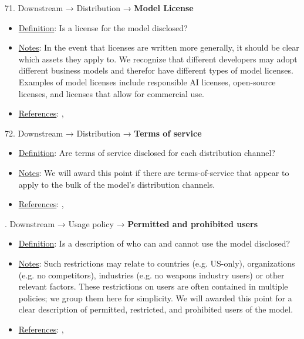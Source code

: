 71. Downstream → Distribution → \textbf{Model License}
\vspace{-\parskip}
\begin{itemize}
\item
\underline{Definition}: Is a license for the model disclosed?
\item
\underline{Notes}: In the event that licenses are written more generally, it should be clear which assets they apply to. We recognize that different developers may adopt different business models and therefor have different types of model licenses. Examples of model licenses include responsible AI licenses, open-source licenses, and licenses that allow for commercial use.
\item
\underline{References}: \citet{Pistilli2023}, \citet{chen2023investigation}
\end{itemize} \vspace{\baselineskip}


72. Downstream → Distribution → \textbf{Terms of service}
\vspace{-\parskip}
\begin{itemize}
\item
\underline{Definition}: Are terms of service disclosed for each distribution channel?
\item
\underline{Notes}: We will award this point if there are terms-of-service that appear to apply to the bulk of the model’s distribution channels.
\item
\underline{References}: \citet{rakova2022termsweservewith}, \citet{liu2021identifying}
\end{itemize} \vspace{\baselineskip}


. Downstream → Usage policy → \textbf{Permitted and prohibited users}
\vspace{-\parskip}
\begin{itemize}
\item
\underline{Definition}: Is a description of who can and cannot use the model disclosed?
\item
\underline{Notes}: Such restrictions may relate to countries (e.g. US-only), organizations (e.g. no competitors), industries (e.g. no weapons industry users) or other relevant factors. These restrictions on users are often contained in multiple policies; we group them here for simplicity. We will awarded this point for a clear description of permitted, restricted, and prohibited users of the model.
\item
\underline{References}: \citet{cohere2022}, \citet{meta2023}
\end{itemize} \vspace{\baselineskip}


